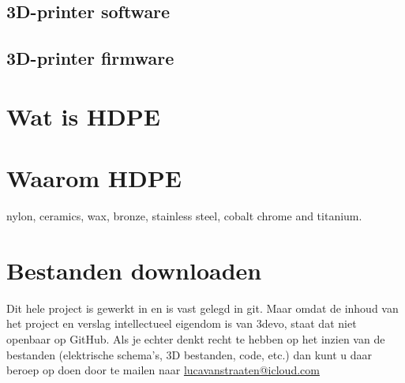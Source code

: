 \subsection{3D-printer software}



\subsection{3D-printer firmware}

\section{Wat is HDPE}

\section{Waarom HDPE}

nylon, ceramics, wax, bronze, stainless steel, cobalt chrome and titanium.

\section{Bestanden downloaden}

Dit hele project is gewerkt in en is vast gelegd in git. Maar omdat de inhoud
van het project en verslag intellectueel eigendom is van 3devo, staat dat niet
openbaar op GitHub. Als je echter denkt recht te hebben op het inzien van de
bestanden (elektrische schema's, 3D bestanden, code, etc.) dan kunt u daar
beroep op doen door te mailen naar
\href{mailto:lucavanstraaten@icloud.com}{lucavanstraaten@icloud.com}
